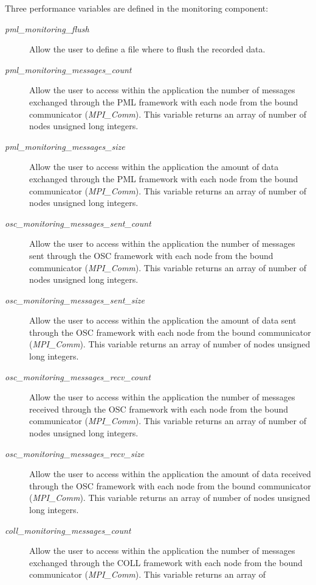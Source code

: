 \documentclass[notitlepage]{article}
\begin{document}
Three performance variables are defined in the monitoring component:
\begin{description}
\item [\textit{pml\_monitoring\_flush}] Allow the user to define a
  file where to flush the recorded data.
\item [\textit{pml\_monitoring\_messages\_count}] Allow the user to
  access within the application the number of messages exchanged
  through the PML framework with each node from the bound communicator
  (\textit{MPI\_Comm}). This variable returns an array of number of
  nodes unsigned long integers.
\item [\textit{pml\_monitoring\_messages\_size}] Allow the user to
  access within the application the amount of data exchanged through
  the PML framework with each node from the bound communicator
  (\textit{MPI\_Comm}). This variable returns an array of number of
  nodes unsigned long integers.
\item [\textit{osc\_monitoring\_messages\_sent\_count}] Allow the user
  to access within the application the number of messages sent through
  the OSC framework with each node from the bound communicator
  (\textit{MPI\_Comm}). This variable returns an array of number of
  nodes unsigned long integers.
\item [\textit{osc\_monitoring\_messages\_sent\_size}] Allow the user
  to access within the application the amount of data sent through the
  OSC framework with each node from the bound communicator
  (\textit{MPI\_Comm}). This variable returns an array of number of
  nodes unsigned long integers.
\item [\textit{osc\_monitoring\_messages\_recv\_count}] Allow the user
  to access within the application the number of messages received
  through the OSC framework with each node from the bound communicator
  (\textit{MPI\_Comm}). This variable returns an array of number of
  nodes unsigned long integers.
\item [\textit{osc\_monitoring\_messages\_recv\_size}] Allow the user
  to access within the application the amount of data received through
  the OSC framework with each node from the bound communicator
  (\textit{MPI\_Comm}). This variable returns an array of number of
  nodes unsigned long integers.
\item [\textit{coll\_monitoring\_messages\_count}] Allow the user to
  access within the application the number of messages exchanged
  through the COLL framework with each node from the bound
  communicator (\textit{MPI\_Comm}). This variable returns an array of

\end{description}
\end{document}
